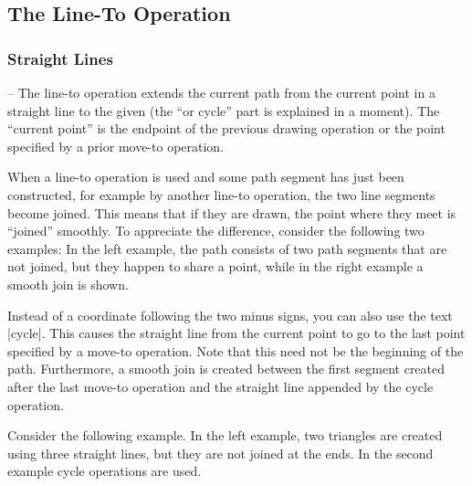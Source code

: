 \subsection{The Line-To Operation}

\subsubsection{Straight Lines}

\begin{pathoperation}{--}{}
  The line-to operation extends the current path from the current
  point in a straight line to the given  (the ``or
  cycle'' part is explained in a moment). The ``current
  point'' is the endpoint of the previous drawing operation or the point
  specified by a prior move-to operation.

  When a line-to operation is used and some path segment has just been
  constructed, for example by another line-to operation, the two line
  segments become joined. This means that if they are drawn, the point
  where they meet is ``joined'' smoothly. To appreciate the difference,
  consider the following two examples: In the left example, the path
  consists of two path segments that are not joined, but they happen to
  share a point, while in the right example a smooth join is shown.

\begin{codeexample}[]
\end{codeexample}

  Instead of a coordinate following the two minus signs, you can also
  use the text |cycle|. This causes the straight line from the current 
  point to go to the last point specified by a move-to operation. Note
  that this need not be the beginning of the path. Furthermore, a
  smooth join is created between the first segment created after the
  last move-to operation and the straight line appended by the cycle
  operation. 

  Consider the following example. In the left example, two triangles are
  created using three straight lines, but they are not joined at the
  ends. In the second example cycle operations are used.

\begin{codeexample}[]
\end{codeexample}
\end{pathoperation}

